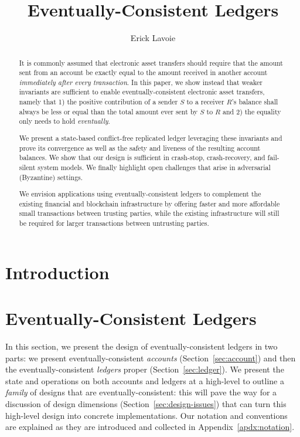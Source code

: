 \documentclass[9pt, oneside]{article}   	%
\title{Eventually-Consistent Ledgers}
\author{Erick Lavoie}
\begin{document}
\maketitle


\begin{abstract}
It is commonly assumed that electronic asset transfers should require that the amount sent from an account be exactly equal to the amount received in another account \textit{immediately after every transaction}.  In this paper, we show instead that weaker invariants are sufficient to enable eventually-consistent electronic asset transfers, namely that 1) the positive contribution of a sender $S$ to a receiver $R$'s balance shall always be less or equal than the total amount ever sent by $S$ to $R$ and 2) the equality only needs to hold \textit{eventually}.

We present a state-based conflict-free replicated ledger leveraging these invariants and prove its convergence as well as the safety and liveness of the resulting account balances. We show that our design is sufficient in crash-stop, crash-recovery, and fail-silent system models. We finally highlight open challenges that arise in adversarial (Byzantine) settings. 

We envision applications using eventually-consistent ledgers to complement the existing financial and blockchain infrastructure by offering faster and more affordable small transactions between trusting parties, while the existing infrastructure will still be required for larger transactions between untrusting parties.
\end{abstract}

\section{Introduction}
\label{sec:introduction}

\section{Eventually-Consistent Ledgers}

In this section, we present the design of eventually-consistent ledgers in two parts: we present eventually-consistent \textit{accounts} (Section~\ref{sec:account}) and then the eventually-consistent \textit{ledgers} proper (Section~\ref{sec:ledger}). We present the state and operations on both accounts and ledgers at a high-level to outline a \textit{family} of designs that are eventually-consistent: this will pave the way for a discussion of design dimensions (Section~\ref{sec:design-issues}) that can turn this high-level design into concrete implementations. Our notation and conventions are explained as they are introduced and collected in Appendix~\ref{apdx:notation}.
\end{document}
